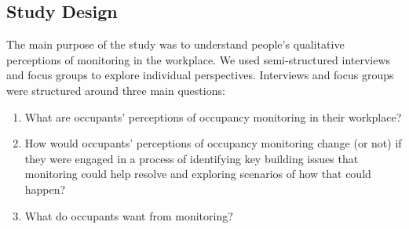 \subsection{Study Design}
\label{sec:study-design}

The main purpose of the study was to understand people’s qualitative
perceptions of monitoring in the workplace. We used semi-structured
interviews and focus groups to explore individual perspectives. 
Interviews and focus groups were structured around three main
questions:
\begin{enumerate}[noitemsep]
\item What are occupants’ perceptions of occupancy monitoring in their workplace?
\item How would occupants’ perceptions of occupancy monitoring change
  (or not) if they were engaged in a process of identifying key
  building issues that monitoring could help resolve and exploring
  scenarios of how that could happen? 
\item What do occupants want from monitoring?
\end{enumerate}

